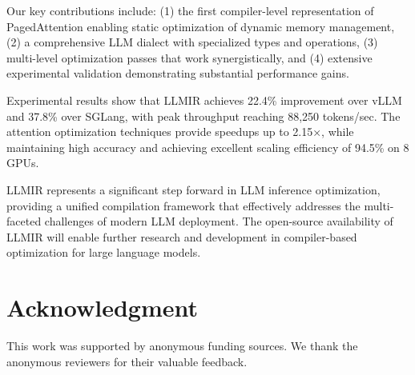\documentclass[conference]{IEEEtran}
\begin{document}
Our key contributions include: (1) the first compiler-level representation of PagedAttention enabling static optimization of dynamic memory management, (2) a comprehensive LLM dialect with specialized types and operations, (3) multi-level optimization passes that work synergistically, and (4) extensive experimental validation demonstrating substantial performance gains.

Experimental results show that LLMIR achieves 22.4\% improvement over vLLM and 37.8\% over SGLang, with peak throughput reaching 88,250 tokens/sec. The attention optimization techniques provide speedups up to 2.15×, while maintaining high accuracy and achieving excellent scaling efficiency of 94.5\% on 8 GPUs.

LLMIR represents a significant step forward in LLM inference optimization, providing a unified compilation framework that effectively addresses the multi-faceted challenges of modern LLM deployment. The open-source availability of LLMIR will enable further research and development in compiler-based optimization for large language models.

\section*{Acknowledgment}

This work was supported by anonymous funding sources. We thank the anonymous reviewers for their valuable feedback.
\end{document}
